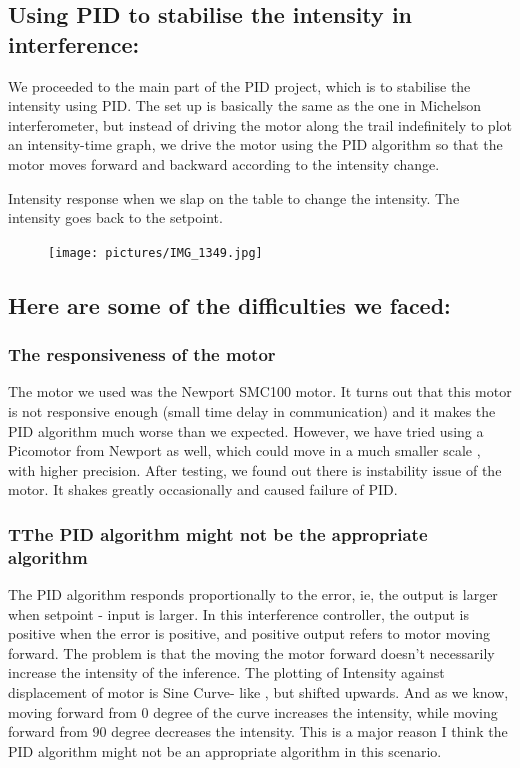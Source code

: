 \documentclass{article}
\begin{document}
\subsection{Using PID to stabilise the intensity in interference:}

We proceeded to the main part of the PID project, which is to stabilise  the intensity using PID. The set up is basically the same as the one in Michelson interferometer, but instead of driving the motor along the trail indefinitely to plot an intensity-time graph, we drive the motor using the PID algorithm so that the motor moves forward and backward according to the intensity change.


Intensity response when we slap on the table to change the intensity. The intensity goes back to the setpoint. 

\begin{figure}[H]
\centering
\texttt{[image: pictures/IMG\_1349.jpg]}
\end{figure}

\subsection{Here are some of the difficulties we faced:}



\subsubsection{The responsiveness of the motor}

The motor we used was the Newport SMC100 motor. It turns out that this motor is not responsive enough (small time delay in communication) and it makes the PID algorithm much worse than we expected. However, we have tried using a Picomotor from Newport as well, which could move in a much smaller scale , with higher precision. After testing, we found out there is instability issue of the motor. It shakes greatly occasionally and caused failure of PID.

\subsubsection{TThe PID algorithm might not be the appropriate algorithm}

The PID algorithm responds proportionally to the error, ie, the output is larger when setpoint - input is larger. In this interference controller, the output is positive when the error is positive, and positive output refers to motor moving forward. The problem is that the moving the motor forward doesn’t necessarily increase the intensity of the inference. The plotting of Intensity against displacement of motor is Sine Curve- like , but shifted upwards. And as we know, moving forward from 0 degree of the curve increases the intensity, while moving forward from 90 degree decreases the intensity. This is a major reason I think the PID algorithm might not be an appropriate algorithm in this scenario.
\end{document}
